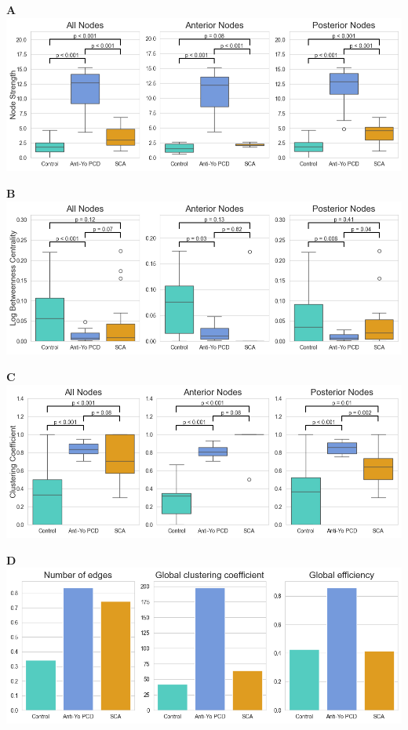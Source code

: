 \documentclass{standalone}
\begin{document}
\centering
\begin{minipage}[t]{0.45\textwidth}
    \textbf{A}\\[4pt]
    \includegraphics[width=\textwidth]{graphics/node_strength.png}
\end{minipage}
\begin{minipage}[t]{0.45\textwidth}
    \textbf{B}\\[4pt]
    \includegraphics[width=\textwidth]{graphics/betweenness.png}
\end{minipage}
\begin{minipage}[t]{0.45\textwidth}
    \textbf{C}\\[4pt]
    \includegraphics[width=\textwidth]{graphics/clustering_coefficient.png}
\end{minipage}
\begin{minipage}[t]{0.45\textwidth}
    \textbf{D}\\[4pt]
    \includegraphics[width=\textwidth]{graphics/barplots_graph.png}
\end{minipage}
\end{document}
